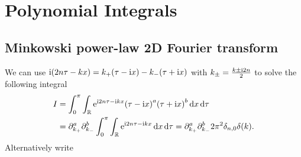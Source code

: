 \documentclass[english, parskip=full]{scrartcl}
\begin{document}
\section{Polynomial Integrals}
\subsection{Minkowski power-law 2D Fourier transform}
We can use $\text{i} (2n\tau - kx) = k_+ (\tau-\text{i} x) - k_- (\tau+\text{i} x)$ with $k_\pm = \frac{k \pm \text{i} 2n}{2}$ to solve the following integral
\begin{align}
I &= \intx{0}{\pi}{\intr{\powe{\i 2n\tau - \i kx} \kla*{\tau-\i x}^{a} \kla*{\tau+\i x}^{b}}{x} }{\tau}\\
&= \partial_{k_+}^a \partial_{k_-}^b \intx{0}{\pi}{\intr{\powe{\i 2n\tau - \i kx} }{x} }{\tau} = \partial_{k_+}^a \partial_{k_-}^b 2\pi^2 \delta_{n,0} \delta(k).
\end{align}
Alternatively write
\end{document}
